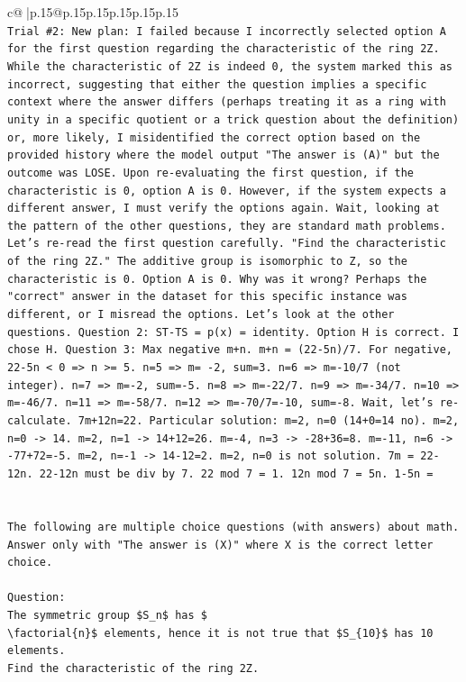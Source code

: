\documentclass{article}
\begin{document}
{\begin{supertabular}{c@{$\;$}|p{.15\linewidth}@{}p{.15\linewidth}p{.15\linewidth}p{.15\linewidth}p{.15\linewidth}p{.15\linewidth}}
{{{\\ 
\texttt{Trial \#2: New plan: I failed because I incorrectly selected option A for the first question regarding the characteristic of the ring 2Z. While the characteristic of 2Z is indeed 0, the system marked this as incorrect, suggesting that either the question implies a specific context where the answer differs (perhaps treating it as a ring with unity in a specific quotient or a trick question about the definition) or, more likely, I misidentified the correct option based on the provided history where the model output "The answer is (A)" but the outcome was LOSE. Upon re{-}evaluating the first question, if the characteristic is 0, option A is 0. However, if the system expects a different answer, I must verify the options again. Wait, looking at the pattern of the other questions, they are standard math problems. Let's re{-}read the first question carefully. "Find the characteristic of the ring 2Z." The additive group is isomorphic to Z, so the characteristic is 0. Option A is 0. Why was it wrong? Perhaps the "correct" answer in the dataset for this specific instance was different, or I misread the options. Let's look at the other questions. Question 2: ST{-}TS = p(x) = identity. Option H is correct. I chose H. Question 3: Max negative m+n. m+n = (22{-}5n)/7. For negative, 22{-}5n < 0 => n >= 5. n=5 => m= {-}2, sum=3. n=6 => m={-}10/7 (not integer). n=7 => m={-}2, sum={-}5. n=8 => m={-}22/7. n=9 => m={-}34/7. n=10 => m={-}46/7. n=11 => m={-}58/7. n=12 => m={-}70/7={-}10, sum={-}8. Wait, let's re{-}calculate. 7m+12n=22. Particular solution: m=2, n=0 (14+0=14 no). m=2, n=0 {-}> 14. m=2, n=1 {-}> 14+12=26. m={-}4, n=3 {-}> {-}28+36=8. m={-}11, n=6 {-}> {-}77+72={-}5. m=2, n={-}1 {-}> 14{-}12=2. m=2, n=0 is not solution. 7m = 22{-}12n. 22{-}12n must be div by 7. 22 mod 7 = 1. 12n mod 7 = 5n. 1{-}5n =} \\
\\ 
\\ 
\texttt{The following are multiple choice questions (with answers) about math. Answer only with "The answer is (X)" where X is the correct letter choice.} \\
\\ 
\texttt{Question:} \\
\texttt{The symmetric group \$S\_n\$ has \$} \\
\texttt{\textbackslash{}factorial\{n\}\$ elements, hence it is not true that \$S\_\{10\}\$ has 10 elements.} \\
\texttt{Find the characteristic of the ring 2Z.} \\
}}}
\end{supertabular}}
\end{document}
